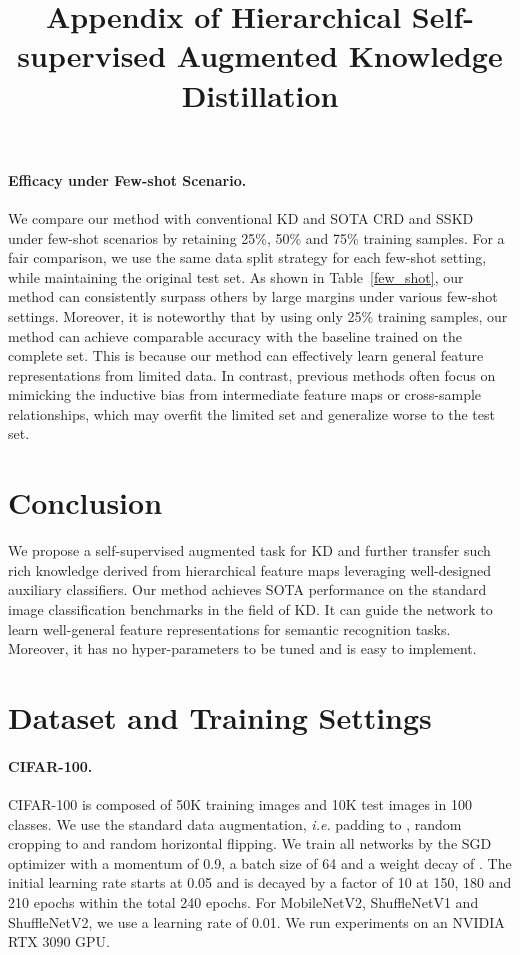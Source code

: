 \documentclass{article}
\begin{document}
\paragraph{Efficacy under Few-shot Scenario.} We compare our method with conventional KD and SOTA CRD and SSKD under few-shot scenarios by retaining 25\%, 50\% and 75\% training samples. For a fair comparison, we use the same data split strategy for each few-shot setting, while maintaining the original test set. As shown in Table~\ref{few_shot}, our method can consistently surpass others by large margins under various few-shot settings. Moreover, it is noteworthy that by using only 25\% training samples, our method can achieve comparable accuracy with the baseline trained on the complete set. This is because our method can effectively learn general feature representations from limited data. In contrast, previous methods often focus on mimicking the inductive bias from intermediate feature maps or cross-sample relationships, which may overfit the limited set and generalize worse to the test set.

\section{Conclusion}
We propose a self-supervised augmented task for KD and further transfer such rich knowledge derived from hierarchical feature maps leveraging well-designed auxiliary classifiers. Our method achieves SOTA performance on the standard image classification benchmarks in the field of KD. It can guide the network to learn well-general feature representations for semantic recognition tasks. Moreover, it has no hyper-parameters to be tuned and is easy to implement.

\appendix





\title{Appendix of Hierarchical Self-supervised Augmented Knowledge Distillation}
\appendix

\maketitle
\appendix

\section{Dataset and Training Settings}
\paragraph{CIFAR-100.} CIFAR-100 is composed of 50K training images and 10K test images in 100 classes. We use the standard data augmentation, \emph{i.e.} padding to , random cropping to  and random horizontal flipping. We train all networks by the SGD optimizer with a momentum of 0.9, a batch size of 64 and a weight decay of . The initial learning rate starts at 0.05 and is decayed by a factor of 10 at 150, 180 and 210 epochs within the total 240 epochs. For MobileNetV2, ShuffleNetV1 and ShuffleNetV2, we use a learning rate of 0.01. We run experiments on an NVIDIA RTX 3090 GPU.
\end{document}
